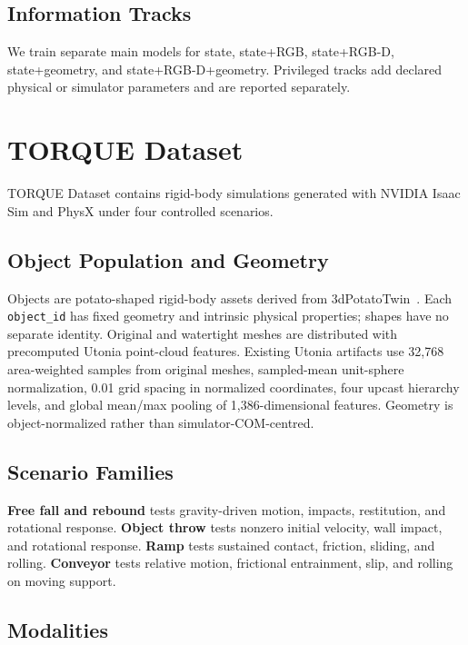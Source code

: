 \documentclass{article}
\begin{document}
\subsection{Information Tracks}

We train separate main models for state, state+RGB, state+RGB-D, state+geometry, and state+RGB-D+geometry. Privileged tracks add declared physical or simulator parameters and are reported separately.

\section{TORQUE Dataset}

TORQUE Dataset contains rigid-body simulations generated with NVIDIA Isaac Sim and PhysX under four controlled scenarios.

\subsection{Object Population and Geometry}

Objects are potato-shaped rigid-body assets derived from 3dPotatoTwin~\cite{blok_high-throughput_2025}. Each \texttt{object\_id} has fixed geometry and intrinsic physical properties; shapes have no separate identity. Original and watertight meshes are distributed with precomputed Utonia point-cloud features. Existing Utonia artifacts use 32,768 area-weighted samples from original meshes, sampled-mean unit-sphere normalization, 0.01 grid spacing in normalized coordinates, four upcast hierarchy levels, and global mean/max pooling of 1,386-dimensional features. Geometry is object-normalized rather than simulator-COM-centred.

\subsection{Scenario Families}

\textbf{Free fall and rebound} tests gravity-driven motion, impacts, restitution, and rotational response. \textbf{Object throw} tests nonzero initial velocity, wall impact, and rotational response. \textbf{Ramp} tests sustained contact, friction, sliding, and rolling. \textbf{Conveyor} tests relative motion, frictional entrainment, slip, and rolling on moving support.

\subsection{Modalities}
\end{document}
